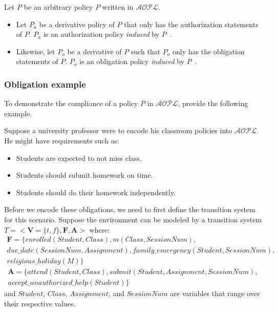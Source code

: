 \begin{definition}
    Let $P$ be an arbitrary policy $P$ written in $\mathcal{AOPL}$.

    \begin{itemize}
        \item Let $P_a$ be a derivative policy of $P$ that only has the authorization statements of $P$.
            $P_a$ is an authorization policy \textit{induced} by $P$~\citep{gelfond_authorization_2008}.
        \item Likewise, let $P_o$ be a derivative of $P$ such that $P_o$ only has the obligation statements of $P$.
            $P_o$ is an obligation policy \textit{induced} by $P$~\citep{gelfond_authorization_2008}.
    \end{itemize}
\end{definition}

\subsubsection{Obligation example}

To demonstrate the compliance of a policy $P$ in $\mathcal{AOPL}$, \citet{gelfond_authorization_2008} provide the following example.

Suppose a university professor were to encode his classroom policies into $\mathcal{AOPL}$.
He might have requirements such as:

\begin{itemize}
    \item Students are expected to not miss class.
    \item Students should submit homework on time.
    \item Students should do their homework independently.
\end{itemize}

Before we encode these obligations, we need to first define the transition system for this scenario.
Suppose the environment can be modeled by a transition system $T=<\boldsymbol{V}=\{t,f\}, \boldsymbol{F}, \boldsymbol{A}>$ where:
\begin{multline*}
    \boldsymbol{F} = \{enrolled(Student, Class), m(Class, SessionNum), \\
        due\_date(SessionNum, Assignment), family\_emergency(Student, SessionNum), \\
        religious\_holiday(M)\}
\end{multline*}
\begin{multline*}
    \boldsymbol{A} = \{attend(Student, Class), submit(Student, Assignment, SessionNum), \\
        accept\_unauthorized\_help(Student)\}
\end{multline*}
and $Student$, $Class$, $Assignment$, and $SessionNum$ are variables that range over their respective values.

